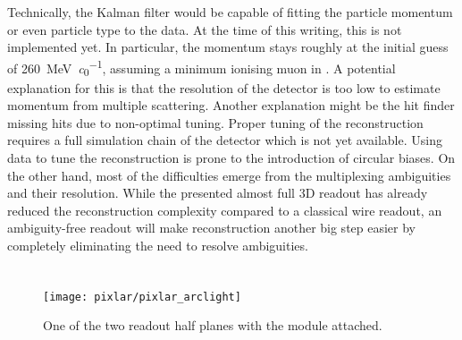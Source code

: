 Technically, the Kalman filter would be capable of fitting the particle momentum or even particle type to the data.
At the time of this writing, this is not implemented yet.
In particular, the momentum stays roughly at the initial guess of \SI{260}{\mega\electronvolt\per\clight}, assuming a minimum ionising muon in \lar{}.
A potential explanation for this is that the resolution of the detector is too low to estimate momentum from multiple scattering.
Another explanation might be the hit finder missing hits due to non-optimal tuning.
Proper tuning of the reconstruction requires a full simulation chain of the detector which is not yet available.
Using data to tune the reconstruction is prone to the introduction of circular biases.
On the other hand, most of the difficulties emerge from the multiplexing ambiguities and their resolution.
While the presented almost full 3D readout has already reduced the reconstruction complexity compared to a classical wire readout, an ambiguity-free readout will make reconstruction another big step easier by completely eliminating the need to resolve ambiguities.


\section{\pixlar{}}
\label{sec:ac_pixlar}

\begin{figure}[htb]
	\centering
	\texttt{[image: pixlar/pixlar\_arclight]}
	\caption{One of the two \pixlar{} readout half planes with the \AL{} module attached.}
	\label{fig:pixlar_arclight}
\end{figure}

